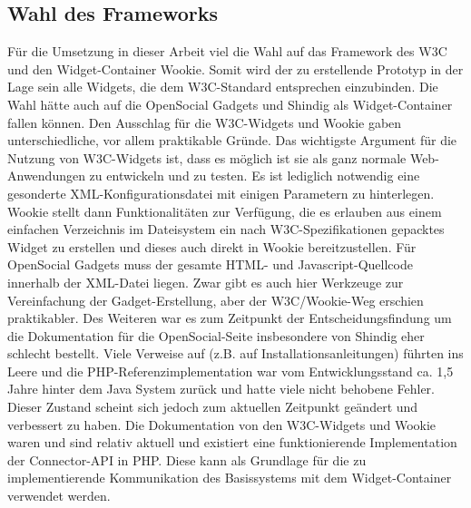 \subsection{Wahl des Frameworks}
Für die Umsetzung in dieser Arbeit viel die Wahl auf das Framework des W3C und den Widget-Container Wookie. Somit wird der zu erstellende Prototyp in der Lage sein alle Widgets, die dem W3C-Standard entsprechen einzubinden. Die Wahl hätte auch auf die OpenSocial Gadgets und Shindig als Widget-Container fallen können. Den Ausschlag für die W3C-Widgets und Wookie gaben unterschiedliche, vor allem praktikable Gründe. Das wichtigste Argument für die Nutzung von W3C-Widgets ist, dass es möglich ist sie als ganz normale Web-Anwendungen zu entwickeln und zu testen. Es ist lediglich notwendig eine gesonderte XML-Konfigurationsdatei mit einigen Parametern zu hinterlegen. Wookie stellt dann Funktionalitäten zur Verfügung, die es erlauben aus einem einfachen Verzeichnis im Dateisystem ein nach W3C-Spezifikationen gepacktes Widget zu erstellen und dieses auch direkt in Wookie bereitzustellen. Für OpenSocial Gadgets muss der gesamte HTML- und Javascript-Quellcode innerhalb der XML-Datei liegen. Zwar gibt es auch hier Werkzeuge zur Vereinfachung der Gadget-Erstellung, aber der W3C/Wookie-Weg erschien praktikabler. Des Weiteren war es zum Zeitpunkt der Entscheidungsfindung um die Dokumentation für die OpenSocial-Seite insbesondere von Shindig eher schlecht bestellt. Viele Verweise auf (z.B. auf Installationsanleitungen) führten ins Leere und die PHP-Referenzimplementation war vom Entwicklungsstand ca. 1,5 Jahre hinter dem Java System zurück und hatte viele nicht behobene Fehler. Dieser Zustand scheint sich jedoch zum aktuellen Zeitpunkt geändert und verbessert zu haben. Die Dokumentation von den W3C-Widgets und Wookie waren und sind relativ aktuell und existiert eine funktionierende Implementation der Connector-API in PHP. Diese kann als Grundlage für die zu implementierende Kommunikation des Basissystems mit dem Widget-Container verwendet werden.

